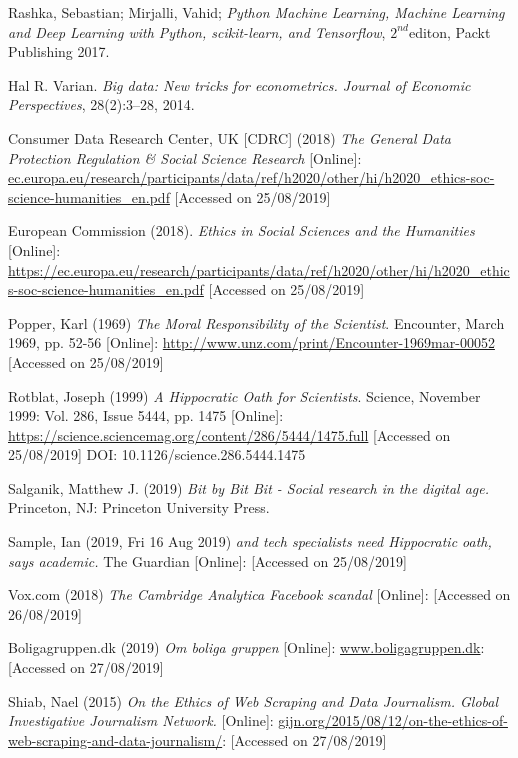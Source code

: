 \documentclass[12pt,a4paper]{article}
\begin{document}
Rashka, Sebastian; Mirjalli, Vahid; \textit{Python Machine Learning, Machine Learning and Deep Learning with Python, scikit-learn, and Tensorflow}, $2^{nd}$editon, Packt Publishing 2017.

Hal R. Varian. \textit{Big data: New tricks for econometrics. Journal of Economic Perspectives}, 28(2):3–28, 2014. 

Consumer Data Research Center, UK  [CDRC] (2018) \textit{The General Data Protection Regulation \& Social Science Research} [Online]: \href{https://ec.europa.eu/research/participants/data/ref/h2020/other/hi/h2020_ethics-soc-science-humanities_en.pdf}{ec.europa.eu/research/participants/data/ref/h2020/other/hi/h2020\_ethics-soc-science-humanities\_en.pdf} [Accessed on 25/08/2019]

European Commission (2018). \textit{Ethics in Social Sciences and the Humanities} [Online]: \href{https://ec.europa.eu/research/participants/data/ref/h2020/other/hi/h2020_ethics-soc-science-humanities_en.pdf}{https://ec.europa.eu/research/participants/data/ref/h2020/other/hi/h2020\_ethics-soc-science-humanities\_en.pdf} [Accessed on 25/08/2019] 

Popper, Karl (1969) \textit{The Moral Responsibility of the Scientist}. Encounter, March 1969, pp. 52-56 [Online]: \href{http://www.unz.com/print/Encounter-1969mar-00052}{http://www.unz.com/print/Encounter-1969mar-00052} [Accessed on 25/08/2019]

Rotblat, Joseph (1999) \textit{A Hippocratic Oath for Scientists}. Science, November 1999: Vol. 286, Issue 5444, pp. 1475 [Online]: \href{https://science.sciencemag.org/content/286/5444/1475.full}{https://science.sciencemag.org/content/286/5444/1475.full} [Accessed on 25/08/2019] DOI: 10.1126/science.286.5444.1475 

Salganik, Matthew J. (2019) \textit{Bit by Bit Bit - Social research in the digital age.} Princeton, NJ: Princeton University Press.

Sample, Ian (2019, Fri 16 Aug 2019) \textit{and tech specialists need Hippocratic oath, says academic.} The Guardian [Online]: \href{https://www.theguardian.com/science/2019/aug/16/mathematicians-need-doctor-style-hippocratic-oath-says-academic-hannah-fry} [Accessed on 25/08/2019]

Vox.com (2018) \textit{The Cambridge Analytica Facebook scandal} [Online]: \href{https://www.vox.com/2018/4/10/17207394/cambridge-analytica-facebook-zuckerberg-trump-privacy-scandal} [Accessed on 26/08/2019] 

Boligagruppen.dk (2019) \textit{Om boliga gruppen} [Online]: \href{https://www.boligagruppen.dk}{www.boligagruppen.dk}: [Accessed on 27/08/2019]

Shiab, Nael (2015) \textit{On the Ethics of Web Scraping and Data Journalism. Global Investigative Journalism Network.} [Online]: \href{https://gijn.org/2015/08/12/on-the-ethics-of-web-scraping-and-data-journalism/}{gijn.org/2015/08/12/on-the-ethics-of-web-scraping-and-data-journalism/}: [Accessed on 27/08/2019]
\end{document}
